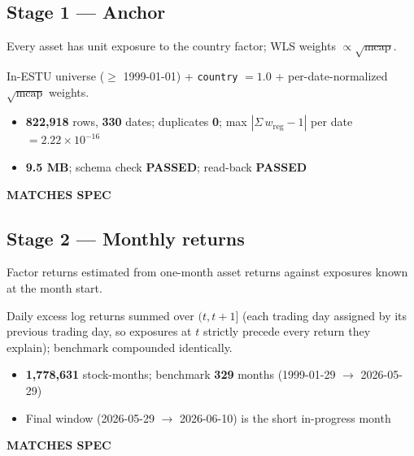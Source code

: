 \documentclass[11pt,a4paper]{article}
\newcommand{\PASS}[1]{\textcolor{pass}{\textbf{#1}}}
\begin{document}
\subsection{Stage 1 --- Anchor}

\begin{description}[style=nextline]
  \item[PDF SPEC] Every asset has unit exposure to the country factor; WLS weights $\propto \sqrt{\text{mcap}}$.
  \item[Implementation] In-ESTU universe ($\geq$ 1999-01-01) + \texttt{country} $= 1.0$ + per-date-normalized $\sqrt{\text{mcap}}$ weights.
  \item[Observed]\phantom{x}
    \begin{itemize}[nosep, topsep=-\parskip]
      \item \textbf{822{,}918} rows, \textbf{330} dates; duplicates \textbf{0}; max $|\Sigma\, w_{\text{reg}} - 1|$ per date $= 2.22\times10^{-16}$
      \item \textbf{9.5 MB}; schema check \PASS{PASSED}; read-back \PASS{PASSED}
    \end{itemize}
  \item[Status] \PASS{MATCHES SPEC}
\end{description}

\subsection{Stage 2 --- Monthly returns}

\begin{description}[style=nextline]
  \item[PDF SPEC] Factor returns estimated from one-month asset returns against exposures known at the month start.
  \item[Implementation] Daily excess log returns summed over $(t, t{+}1]$ (each trading day assigned by its previous trading day, so exposures at $t$ strictly precede every return they explain); benchmark compounded identically.
  \item[Observed]\phantom{x}
    \begin{itemize}[nosep, topsep=-\parskip]
      \item \textbf{1{,}778{,}631} stock-months; benchmark \textbf{329} months (1999-01-29 $\to$ 2026-05-29)
      \item Final window (2026-05-29 $\to$ 2026-06-10) is the short in-progress month
    \end{itemize}
  \item[Status] \PASS{MATCHES SPEC}
\end{description}
\end{document}
